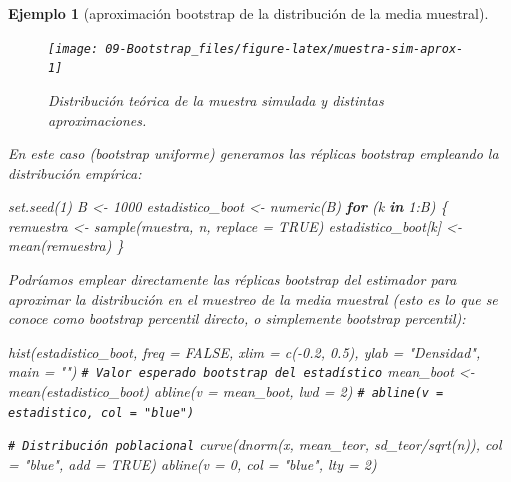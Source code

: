 \documentclass[
  10pt,
]{book}
\newenvironment{Shaded}{\begin{snugshade}}{\end{snugshade}}
\newcommand{\AttributeTok}[1]{\textcolor[rgb]{0.77,0.63,0.00}{#1}}
\newcommand{\CommentTok}[1]{\textcolor[rgb]{0.56,0.35,0.01}{\textit{#1}}}
\newcommand{\ConstantTok}[1]{\textcolor[rgb]{0.00,0.00,0.00}{#1}}
\newcommand{\ControlFlowTok}[1]{\textcolor[rgb]{0.13,0.29,0.53}{\textbf{#1}}}
\newcommand{\DecValTok}[1]{\textcolor[rgb]{0.00,0.00,0.81}{#1}}
\newcommand{\FloatTok}[1]{\textcolor[rgb]{0.00,0.00,0.81}{#1}}
\newcommand{\FunctionTok}[1]{\textcolor[rgb]{0.00,0.00,0.00}{#1}}
\newcommand{\NormalTok}[1]{#1}
\newcommand{\OtherTok}[1]{\textcolor[rgb]{0.56,0.35,0.01}{#1}}
\newcommand{\SpecialCharTok}[1]{\textcolor[rgb]{0.00,0.00,0.00}{#1}}
\newcommand{\StringTok}[1]{\textcolor[rgb]{0.31,0.60,0.02}{#1}}
\theoremstyle{break}
\newtheorem{example}{Ejemplo}[chapter]
\theoremstyle{nonumberplain}
\renewcommand{\CommentTok}[1]{\textcolor[rgb]{0.41,0.41,0.41}{\texttt{#1}}}
\begin{document}
\begin{example}[aproximación bootstrap de la distribución de la media muestral]
\begin{figure}[!htbp]
{\centering \texttt{[image: 09-Bootstrap\_files/figure-latex/muestra-sim-aprox-1]} 

}

\caption{Distribución teórica de la muestra simulada y distintas aproximaciones.}\label{fig:muestra-sim-aprox}
\end{figure}

En este caso (bootstrap uniforme) generamos las réplicas bootstrap empleando la distribución empírica:

\begin{Shaded}
\begin{Highlighting}[]
\FunctionTok{set.seed}\NormalTok{(}\DecValTok{1}\NormalTok{)}
\NormalTok{B }\OtherTok{\textless{}{-}} \DecValTok{1000}
\NormalTok{estadistico\_boot }\OtherTok{\textless{}{-}} \FunctionTok{numeric}\NormalTok{(B)}
\ControlFlowTok{for}\NormalTok{ (k }\ControlFlowTok{in} \DecValTok{1}\SpecialCharTok{:}\NormalTok{B) \{}
\NormalTok{    remuestra }\OtherTok{\textless{}{-}} \FunctionTok{sample}\NormalTok{(muestra, n, }\AttributeTok{replace =} \ConstantTok{TRUE}\NormalTok{)}
\NormalTok{    estadistico\_boot[k] }\OtherTok{\textless{}{-}} \FunctionTok{mean}\NormalTok{(remuestra)}
\NormalTok{\}}
\end{Highlighting}
\end{Shaded}

Podríamos emplear directamente las réplicas bootstrap del estimador para aproximar la distribución en el muestreo de la media muestral (esto es lo que se conoce como bootstrap percentil directo, o simplemente bootstrap percentil):

\begin{Shaded}
\begin{Highlighting}[]
\FunctionTok{hist}\NormalTok{(estadistico\_boot, }\AttributeTok{freq =} \ConstantTok{FALSE}\NormalTok{, }\AttributeTok{xlim =} \FunctionTok{c}\NormalTok{(}\SpecialCharTok{{-}}\FloatTok{0.2}\NormalTok{, }\FloatTok{0.5}\NormalTok{),}
     \AttributeTok{ylab =} \StringTok{"Densidad"}\NormalTok{, }\AttributeTok{main =} \StringTok{""}\NormalTok{)}
\CommentTok{\# Valor esperado bootstrap del estadístico}
\NormalTok{mean\_boot }\OtherTok{\textless{}{-}} \FunctionTok{mean}\NormalTok{(estadistico\_boot)  }
\FunctionTok{abline}\NormalTok{(}\AttributeTok{v =}\NormalTok{ mean\_boot, }\AttributeTok{lwd =} \DecValTok{2}\NormalTok{)}
\CommentTok{\# abline(v = estadistico, col = "blue")}

\CommentTok{\# Distribución poblacional}
\FunctionTok{curve}\NormalTok{(}\FunctionTok{dnorm}\NormalTok{(x, mean\_teor, sd\_teor}\SpecialCharTok{/}\FunctionTok{sqrt}\NormalTok{(n)), }\AttributeTok{col =} \StringTok{"blue"}\NormalTok{, }\AttributeTok{add =} \ConstantTok{TRUE}\NormalTok{)}
\FunctionTok{abline}\NormalTok{(}\AttributeTok{v =} \DecValTok{0}\NormalTok{, }\AttributeTok{col =} \StringTok{"blue"}\NormalTok{, }\AttributeTok{lty =} \DecValTok{2}\NormalTok{)}
\end{Highlighting}
\end{Shaded}


\end{example}
\end{document}
